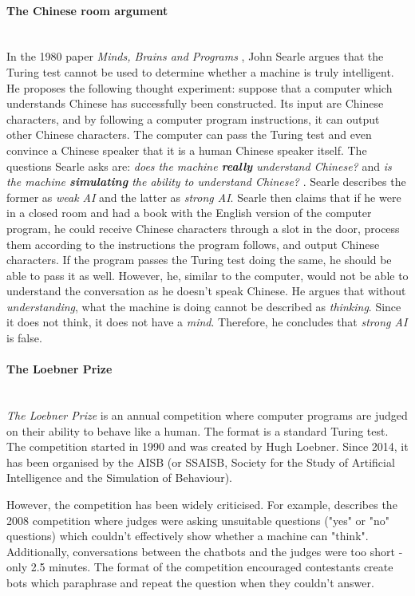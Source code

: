 \documentclass[12pt,a4paper]{article}
\newcommand{\myparagraph}[1]{\paragraph{#1}\mbox{}\\} %
\begin{document}
\myparagraph{The Chinese room argument}
In the 1980 paper \textit{Minds, Brains and Programs} \cite{Searle1980}, John Searle argues that the Turing test cannot be used to determine whether a machine is truly intelligent. He proposes the following thought experiment: suppose that a computer which understands Chinese has successfully been constructed. Its input are Chinese characters, and by following a computer program instructions, it can output other Chinese characters. The computer can pass the Turing test and even convince a Chinese speaker that it is a human Chinese speaker itself. The questions Searle asks are: \textit{does the machine \textbf{really} understand Chinese?} and \textit{is the machine \textbf{simulating} the ability to understand Chinese?} \cite[p.~2]{Searle1980}. Searle describes the former as \textit{weak AI} and the latter as \textit{strong AI}. Searle then claims that if he were in a closed room and had a book with the English version of the computer program, he could receive Chinese characters through a slot in the door, process them according to the instructions the program follows, and output Chinese characters. If the program passes the Turing test doing the same, he should be able to pass it as well. However, he, similar to the computer, would not be able to understand the conversation as he doesn't speak Chinese. He argues that without \textit{understanding}, what the machine is doing cannot be described as \textit{thinking}. Since it does not think, it does not have a \textit{mind}. Therefore, he concludes that \textit{strong AI} is false.

\myparagraph{The Loebner Prize}
\textit{The Loebner Prize} is an annual competition where computer programs are judged on their ability to behave like a human. The format is a standard Turing test. The competition started in 1990 and was created by Hugh Loebner. Since 2014, it has been organised by the AISB (or SSAISB, Society for the Study of Artificial Intelligence and the Simulation of Behaviour).

However, the competition has been widely criticised. For example, \cite{Floridi2009} describes the 2008 competition where judges were asking unsuitable questions ("yes" or "no" questions) which couldn't effectively show whether a machine can "think". Additionally, conversations between the chatbots and the judges were too short - only 2.5 minutes. The format of the competition encouraged contestants create bots which paraphrase and repeat the question when they couldn't answer.
\end{document}
